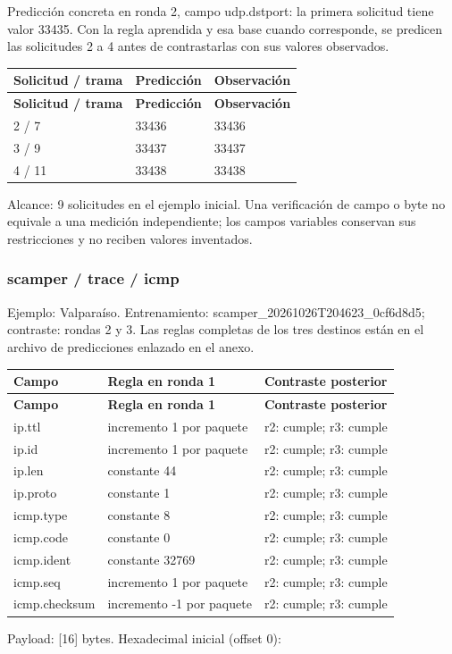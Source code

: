 Predicción concreta en ronda 2, campo udp.dstport: la primera solicitud tiene valor 33435. Con la regla aprendida y esa base cuando corresponde, se predicen las solicitudes 2 a 4 antes de contrastarlas con sus valores observados.

\begingroup
\fontsize{9}{11}\selectfont
\addtocounter{table}{-1}
\begin{longtable}{p{3.2cm}p{5.1cm}p{5.1cm}}
\toprule
\textbf{Solicitud / trama} & \textbf{Predicción} & \textbf{Observación} \\ \midrule
\endfirsthead
\toprule
\textbf{Solicitud / trama} & \textbf{Predicción} & \textbf{Observación} \\ \midrule
\endhead
2 / 7 & 33436 & 33436 \\
3 / 9 & 33437 & 33437 \\
4 / 11 & 33438 & 33438 \\
\bottomrule
\end{longtable}
\endgroup
Alcance: 9 solicitudes en el ejemplo inicial. Una verificación de campo o byte no equivale a una medición independiente; los campos variables conservan sus restricciones y no reciben valores inventados.

\subsubsection{scamper / trace / icmp}
Ejemplo: Valparaíso. Entrenamiento: scamper\_\allowbreak{}20261026T204623\_\allowbreak{}0cf6d8d5; contraste: rondas 2 y 3. Las reglas completas de los tres destinos están en el archivo de predicciones enlazado en el anexo.

\begingroup
\fontsize{9}{11}\selectfont
\addtocounter{table}{-1}
\begin{longtable}{p{3.1cm}p{5.8cm}p{5.1cm}}
\toprule
\textbf{Campo} & \textbf{Regla en ronda 1} & \textbf{Contraste posterior} \\ \midrule
\endfirsthead
\toprule
\textbf{Campo} & \textbf{Regla en ronda 1} & \textbf{Contraste posterior} \\ \midrule
\endhead
ip.ttl & incremento 1 por paquete & r2: cumple; r3: cumple \\
ip.id & incremento 1 por paquete & r2: cumple; r3: cumple \\
ip.len & constante 44 & r2: cumple; r3: cumple \\
ip.proto & constante 1 & r2: cumple; r3: cumple \\
icmp.type & constante 8 & r2: cumple; r3: cumple \\
icmp.code & constante 0 & r2: cumple; r3: cumple \\
icmp.ident & constante 32769 & r2: cumple; r3: cumple \\
icmp.seq & incremento 1 por paquete & r2: cumple; r3: cumple \\
icmp.checksum & incremento -1 por paquete & r2: cumple; r3: cumple \\
\bottomrule
\end{longtable}
\endgroup
Payload: [16] bytes. Hexadecimal inicial (offset 0):

